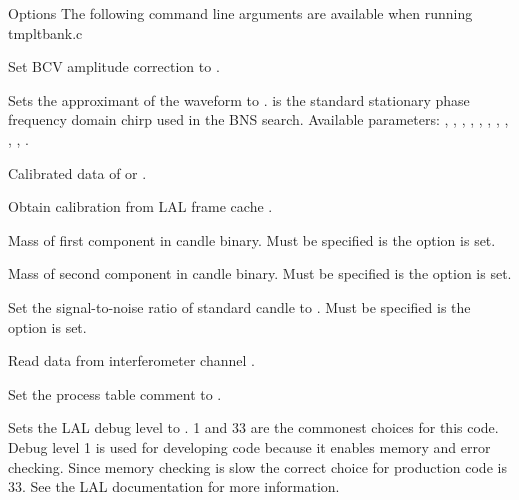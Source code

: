 \begin{entry}
\item[Options]
\noindent The following command line arguments are available when running tmpltbank.c
\\



\item[\option{--alpha} \parm{ alpha}] 
Set BCV amplitude correction to .

\item[\option{--approximant} \parm{ approx}] 
Sets the approximant of the waveform to .  is the standard stationary phase frequency domain chirp used in the BNS search. Available parameters: , , , , , , , , , , .


\item[\option{--calibrated-data} \parm{type}] 
Calibrated data of   or .

\item[\option{--calibration-cache} \parm{cal\_file}] 
Obtain calibration from LAL frame cache .

\item[\option{--candle-mass1} \parm{candle\_mass1}] 
Mass   of first component in candle binary.  Must be specified is the option  is set.

\item[\option{--candle-mass2} \parm{candle\_mass2}] 
Mass  of second component in candle binary. Must be specified is the option  is set.

\item[\option{--candle-snr} \parm{candle\_snr}] 
Set the signal-to-noise ratio of standard candle to . Must be specified is the option  is set.

\item[\option{--channel-name} \parm{channel}] 
Read data from interferometer channel .

\item[\option{--comment} \parm{comment}] 
Set the process table comment to .

\item[\option{--debug-level} \parm{level}] 
Sets the LAL debug level to .  
1 and 33 are the commonest choices for this code.  Debug level 1 is used for 
developing code because it enables memory and error checking.  Since memory 
checking is slow the correct choice for production code is 33.  
See the LAL documentation for more information.  


\end{entry}
